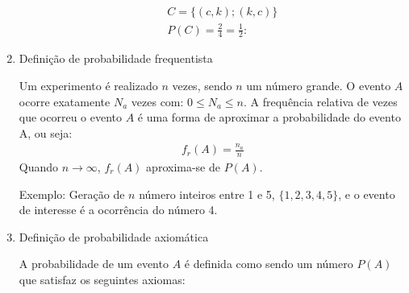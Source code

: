 \documentclass[11pt,a4paper]{book}
\begin{document}
\begin{enumerate}[label=(\alph*)]
\begin{enumerate}
          \begin{align*}
            C= \{ (c,k) ; (k,c)\} \\
            P(C)= \frac{2}{4}= \frac{1}{2}:

          \end{align*}
    \end{enumerate}
  \item Definição de probabilidade frequentista

    Um experimento é realizado  $n$ vezes, sendo $n$ um número grande. O evento $A$ ocorre exatamente $N_a$ vezes com: $0 \le N_a \le n$. A frequência relativa de vezes que ocorreu o evento $A$ é uma forma de aproximar a probabilidade do evento A, ou seja:
    \begin{align}
      f_r (A)= \frac{n_a}{n}
    \end{align}
    Quando $n \to \infty$, $f_r(A)$ aproxima-se de $P(A)$.

    Exemplo: Geração de $n$ número inteiros entre 1 e 5, $\{ 1,2,3,4,5 \}$, e o evento de interesse é a ocorrência do número 4.

  \item Definição de probabilidade axiomática

    A probabilidade de um evento $A$ é definida como sendo um número $P(A)$ que satisfaz
    os seguintes axiomas:
\end{enumerate}
\end{document}
